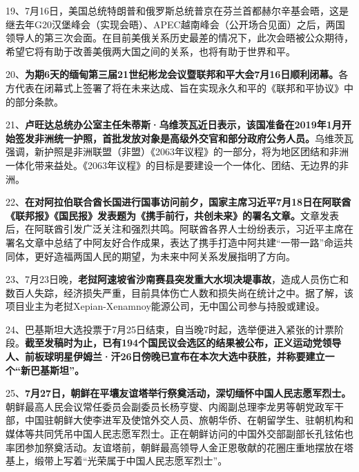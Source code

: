 19、7月16日，美国总统特朗普和俄罗斯总统普京在芬兰首都赫尔辛基会晤，这是继去年G20汉堡峰会（实现会晤）、APEC越南峰会（公开场合见面）之后，两国领导人的第三次会面。在目前美俄关系历史最差的情况下，此次会晤被公众期待，希望它将有助于改善美俄两大国之间的关系，也将有助于世界和平。

20、{\textbf{为期6天的缅甸第三届21世纪彬龙会议暨联邦和平大会7月16日顺利闭幕。}}各方代表在闭幕式上签署了将在未来达成、旨在实现永久和平的《联邦和平协议》中的部分条款。

21、{\textbf{卢旺达总统办公室主任朱蒂斯·乌维茨瓦近日表示，该国准备在2019年1月开始签发非洲统一护照，首批发放对象是高级外交官和部分政府公务人员。}}乌维茨瓦强调，新护照是非洲联盟（非盟）《2063年议程》的一部分，将为地区团结和非洲一体化带来益处。《2063年议程》的目标是要建设一个一体化、团结、无边界的非洲。

22、{\textbf{在对阿拉伯联合酋长国进行国事访问前夕，国家主席习近平7月18日在阿联酋《联邦报》《国民报》发表题为《携手前行，共创未来》的署名文章。}}文章发表后，在阿联酋引发广泛关注和强烈共鸣。阿联酋各界人士纷纷表示，习近平主席在署名文章中总结了中阿友好合作成果，表达了携手打造中阿共建``一带一路''命运共同体，更好造福两国人民的期望，为未来中阿关系发展指明了方向。

23、7月23日晚，{\textbf{老挝阿速坡省沙南赛县突发重大水坝决堤事故}}，造成人员伤亡和数百人失踪，经济损失严重，目前具体伤亡人数和损失尚在统计之中。据了解，该项目业主为老挝Xepian-Xenamnoy能源公司，无中国公司参与持股或建设。

24、巴基斯坦大选投票于7月25日结束，自当晚7时起，选举便进入紧张的计票阶段。{\textbf{截至发稿时为止，已有194个国民议会选区的结果被公布，正义运动党领导人、前板球明星伊姆兰·汗26日傍晚已宣布在本次大选中获胜，并称要建立一个``新巴基斯坦''。}}

25、{\textbf{7月27日，朝鲜在平壤友谊塔举行祭奠活动，深切缅怀中国人民志愿军烈士。}}朝鲜最高人民会议常任委员会副委员长杨亨燮、内阁副总理李龙男等朝党政军干部，中国驻朝鲜大使李进军及使馆外交人员、旅朝华侨、在朝留学生、驻朝机构和媒体等共同凭吊中国人民志愿军烈士。正在朝鲜访问的中国外交部副部长孔铉佑也率团参加祭奠活动。友谊塔前，朝鲜最高领导人金正恩敬献的花圈庄重地摆放在塔基上，缎带上写着``光荣属于中国人民志愿军烈士''。

